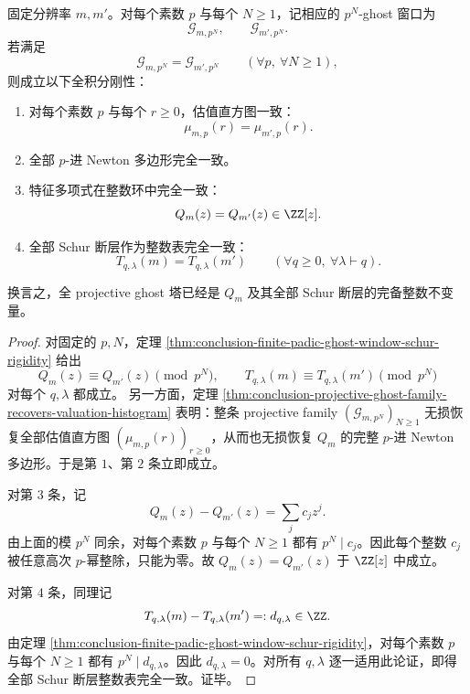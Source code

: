 \begin{theorem}\label{thm:conclusion-projective-ghost-total-integral-rigidity}
固定分辨率 \(m,m'\)。对每个素数 \(p\) 与每个 \(N\ge 1\)，记相应的 \(p^N\)-ghost 窗口为
\[
\mathcal G_{m,p^N},
\qquad
\mathcal G_{m',p^N}.
\]
若满足
\[
\mathcal G_{m,p^N}=\mathcal G_{m',p^N}
\qquad(\forall p,\ \forall N\ge 1),
\]
则成立以下全积分刚性：
\begin{enumerate}
  \item 对每个素数 \(p\) 与每个 \(r\ge 0\)，估值直方图一致：
  \[
  \mu_{m,p}(r)=\mu_{m',p}(r).
  \]

  \item 全部 \(p\)-进 Newton 多边形完全一致。

  \item 特征多项式在整数环中完全一致：
  \[
  Q_m(z)=Q_{m'}(z)\in \ZZ[z].
  \]

  \item 全部 Schur 断层作为整数表完全一致：
  \[
  T_{q,\lambda}(m)=T_{q,\lambda}(m')
  \qquad(\forall q\ge 0,\ \forall \lambda\vdash q).
  \]
\end{enumerate}
换言之，全 projective ghost 塔已经是 \(Q_m\) 及其全部 Schur 断层的完备整数不变量。
\end{theorem}
\begin{proof}
对固定的 \(p,N\)，定理 \ref{thm:conclusion-finite-padic-ghost-window-schur-rigidity} 给出
\[
Q_m(z)\equiv Q_{m'}(z)\pmod{p^N},
\qquad
T_{q,\lambda}(m)\equiv T_{q,\lambda}(m')\pmod{p^N}
\]
对每个 \(q,\lambda\) 都成立。
另一方面，定理 \ref{thm:conclusion-projective-ghost-family-recovers-valuation-histogram} 表明：整条 projective family \((\mathcal G_{m,p^N})_{N\ge 1}\) 无损恢复全部估值直方图 \((\mu_{m,p}(r))_{r\ge 0}\)，从而也无损恢复 \(Q_m\) 的完整 \(p\)-进 Newton 多边形。于是第 \(1\)、第 \(2\) 条立即成立。

对第 \(3\) 条，记
\[
Q_m(z)-Q_{m'}(z)=\sum_j c_j z^j.
\]
由上面的模 \(p^N\) 同余，对每个素数 \(p\) 与每个 \(N\ge 1\) 都有 \(p^N\mid c_j\)。因此每个整数 \(c_j\) 被任意高次 \(p\)-幂整除，只能为零。故 \(Q_m(z)=Q_{m'}(z)\) 于 \(\ZZ[z]\) 中成立。

对第 \(4\) 条，同理记
\[
T_{q,\lambda}(m)-T_{q,\lambda}(m')=:d_{q,\lambda}\in \ZZ.
\]
由定理 \ref{thm:conclusion-finite-padic-ghost-window-schur-rigidity}，对每个素数 \(p\) 与每个 \(N\ge 1\) 都有 \(p^N\mid d_{q,\lambda}\)。因此 \(d_{q,\lambda}=0\)。对所有 \(q,\lambda\) 逐一适用此论证，即得全部 Schur 断层整数表完全一致。证毕。
\end{proof}

